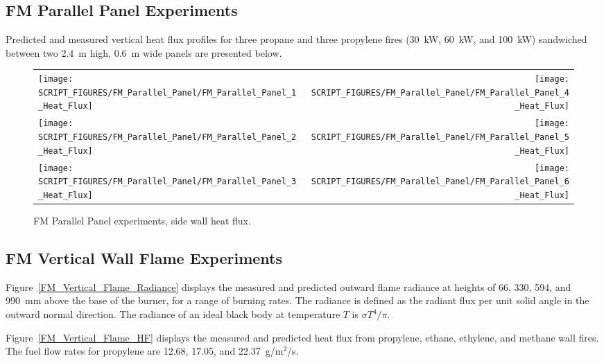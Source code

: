\subsection{FM Parallel Panel Experiments}

Predicted and measured vertical heat flux profiles for three propane and three propylene fires (30~kW, 60~kW, and 100~kW) sandwiched between two 2.4~m high, 0.6~m wide panels are presented below.

\begin{figure}[h!]
\begin{tabular*}{\textwidth}{l@{\extracolsep{\fill}}r}
\texttt{[image: SCRIPT\_FIGURES/FM\_Parallel\_Panel/FM\_Parallel\_Panel\_1\_Heat\_Flux]} &
\texttt{[image: SCRIPT\_FIGURES/FM\_Parallel\_Panel/FM\_Parallel\_Panel\_4\_Heat\_Flux]} \\
\texttt{[image: SCRIPT\_FIGURES/FM\_Parallel\_Panel/FM\_Parallel\_Panel\_2\_Heat\_Flux]} &
\texttt{[image: SCRIPT\_FIGURES/FM\_Parallel\_Panel/FM\_Parallel\_Panel\_5\_Heat\_Flux]} \\
\texttt{[image: SCRIPT\_FIGURES/FM\_Parallel\_Panel/FM\_Parallel\_Panel\_3\_Heat\_Flux]} &
\texttt{[image: SCRIPT\_FIGURES/FM\_Parallel\_Panel/FM\_Parallel\_Panel\_6\_Heat\_Flux]}
\end{tabular*}
\label{FM_Parallel_Panel}
\caption[FM Parallel Panel experiments, side wall heat flux]
{FM Parallel Panel experiments, side wall heat flux.}
\end{figure}

\clearpage

\subsection{FM Vertical Wall Flame Experiments}

Figure~\ref{FM_Vertical_Flame_Radiance} displays the measured and predicted outward flame radiance at heights of 66, 330, 594, and 990~mm above the base of the burner, for a range of burning rates. The radiance is defined as the radiant flux per unit solid angle in the outward normal direction. The radiance of an ideal black body at temperature $T$ is $\sigma T^4/\pi$.

Figure~\ref{FM_Vertical_Flame_HF} displays the measured and predicted heat flux from propylene, ethane, ethylene, and methane wall fires. The fuel flow rates for propylene are 12.68, 17.05, and 22.37~g/m$^2$/s.

